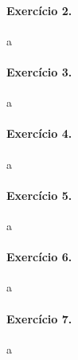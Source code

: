 \documentclass[12pt,a4paper]{article}
\begin{document}
\paragraph{Exercício 2.}
    a
%
\paragraph{Exercício 3.}
    a
%
\paragraph{Exercício 4.}
    a
%
\paragraph{Exercício 5.}
    a
%
\paragraph{Exercício 6.}
    a
%
\paragraph{Exercício 7.}
    a
%
\end{document}

